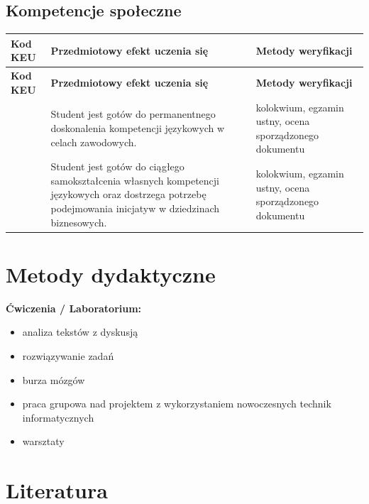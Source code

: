 \documentclass[12pt, a4paper]{article}
\newcommand{\thdrule}{\noalign{\global\setlength{\extrarowheight}{0pt}}}
\newcommand{\thdend}{\noalign{\global\setlength{\extrarowheight}{3pt}}}
\begin{document}
\subsection*{Kompetencje społeczne}
{\scriptsize
\begin{longtable}{m{1.6cm}m{9.0cm}m{4.2cm}}
\thdrule\toprule
\rowcolor{pjatkRed} {\color{white}\footnotesize\textbf{\vphantom{Ag}Kod KEU}} & {\color{white}\footnotesize\textbf{\vphantom{Ag}Przedmiotowy efekt uczenia się}} & {\color{white}\footnotesize\textbf{\vphantom{Ag}Metody weryfikacji}} \\
\midrule\thdend
\endfirsthead
\thdrule\toprule
\rowcolor{pjatkRed} {\color{white}\footnotesize\textbf{\vphantom{Ag}Kod KEU}} & {\color{white}\footnotesize\textbf{\vphantom{Ag}Przedmiotowy efekt uczenia się}} & {\color{white}\footnotesize\textbf{\vphantom{Ag}Metody weryfikacji}} \\
\midrule\thdend
\endhead
  \rowcolor{tableRowLight}  & Student jest gotów do permanentnego doskonalenia kompetencji językowych w celach zawodowych. & kolokwium, egzamin ustny, ocena sporządzonego dokumentu \\
  \rowcolor{tableRowAlt}  & Student jest gotów do ciągłego samokształcenia własnych kompetencji językowych oraz dostrzega potrzebę podejmowania inicjatyw w dziedzinach biznesowych. & kolokwium, egzamin ustny, ocena sporządzonego dokumentu \\
\bottomrule
\end{longtable}}

\section{Metody dydaktyczne}

\textbf{Ćwiczenia / Laboratorium:}
\begin{itemize}
  \item analiza tekstów z dyskusją
  \item rozwiązywanie zadań
  \item burza mózgów
  \item praca grupowa nad projektem z wykorzystaniem nowoczesnych technik informatycznych
  \item warsztaty
\end{itemize}
\vspace{4pt}


\section{Literatura}
\end{document}
